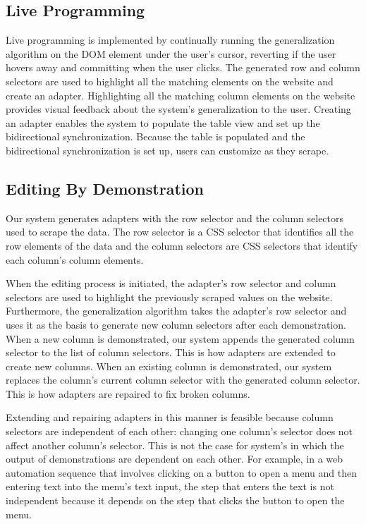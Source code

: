 \documentclass[sigconf,10pt]{acmart}
\begin{document}
\hypertarget{live-programming}{%
\subsection{Live Programming}\label{live-programming}}

Live programming is implemented by continually running the
generalization algorithm on the DOM element under the user's cursor,
reverting if the user hovers away and committing when the user clicks.
The generated row and column selectors are used to highlight all the
matching elements on the website and create an adapter. Highlighting all
the matching column elements on the website provides visual feedback
about the system's generalization to the user. Creating an adapter
enables the system to populate the table view and set up the
bidirectional synchronization. Because the table is populated and the
bidirectional synchronization is set up, users can customize as they
scrape.

\hypertarget{editing-by-demonstration}{%
\subsection{Editing By Demonstration}\label{editing-by-demonstration}}

Our system generates adapters with the row selector and the column
selectors used to scrape the data. The row selector is a CSS selector
that identifies all the row elements of the data and the column
selectors are CSS selectors that identify each column's column elements.

When the editing process is initiated, the adapter's row selector and
column selectors are used to highlight the previously scraped values on
the website. Furthermore, the generalization algorithm takes the
adapter's row selector and uses it as the basis to generate new column
selectors after each demonstration. When a new column is demonstrated,
our system appends the generated column selector to the list of column
selectors. This is how adapters are extended to create new columns. When
an existing column is demonstrated, our system replaces the column's
current column selector with the generated column selector. This is how
adapters are repaired to fix broken columns.

Extending and repairing adapters in this manner is feasible because
column selectors are independent of each other: changing one column's
selector does not affect another column's selector. This is not the case
for system's in which the output of demonstrations are dependent on each
other. For example, in a web automation sequence that involves clicking
on a button to open a menu and then entering text into the menu's text
input, the step that enters the text is not independent because it
depends on the step that clicks the button to open the menu.
\end{document}
